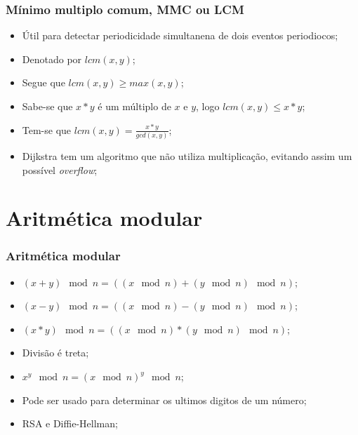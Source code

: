 \documentclass{beamer}
\begin{document}
\begin{frame}
    \frametitle{Mínimo multiplo comum, MMC ou LCM}

    \begin{itemize}
        \item Útil para detectar periodicidade simultanena de dois eventos periodiocos;
        \item Denotado por $lcm(x, y)$;
        \item Segue que $lcm(x, y) \geq max(x, y)$;
        \item Sabe-se que $x*y$ é um múltiplo de $x$ e $y$, logo $lcm(x, y) \leq x*y$;
        \item Tem-se que $lcm(x, y) = \frac{x*y}{gcd(x, y)}$;
        \item Dijkstra tem um algoritmo que não utiliza multiplicação, evitando assim um possível \textit{overflow};
    \end{itemize}
\end{frame}

\section{Aritmética modular}
\begin{frame}
    \frametitle{Aritmética modular}

    \begin{itemize}
        \item $(x + y) \mod n = ((x \mod n) + (y \mod n) \mod n)$;
        \item $(x - y) \mod n = ((x \mod n) - (y \mod n) \mod n)$;
        \item $(x * y) \mod n = ((x \mod n) * (y \mod n) \mod n)$;
        \item Divisão é treta;
        \item $x^y \mod n = (x \mod n)^y \mod n$;
        \item Pode ser usado para determinar os ultimos digitos de um número;
        \item RSA e Diffie-Hellman;
    \end{itemize}
\end{frame}
\end{document}

